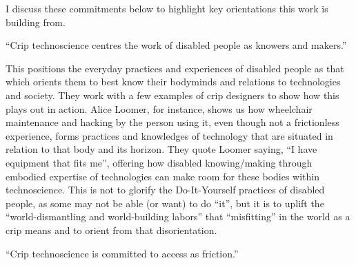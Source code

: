 I discuss these commitments below to highlight key orientations this
work is building from.

``Crip technoscience centres the work of disabled people as knowers and
makers.''

This positions the everyday practices and experiences of disabled people
as that which orients them to best know their bodyminds and relations to
technologies and society. They work with a few examples of crip
designers to show how this plays out in action. Alice Loomer, for
instance, shows us how wheelchair maintenance and hacking by the person
using it, even though not a frictionless experience, forms practices and
knowledges of technology that are situated in relation to that body and
its horizon. They quote Loomer saying, ``I have equipment that fits
me'', offering how disabled knowing/making through embodied expertise of
technologies can make room for these bodies within technoscience. This
is not to glorify the Do-It-Yourself practices of disabled people, as
some may not be able (or want) to do ``it'', but it is to uplift the
``world-dismantling and world-building labors'' that ``misfitting'' in
the world as a crip means and to orient from that disorientation.

``Crip technoscience is committed to access as friction.''

